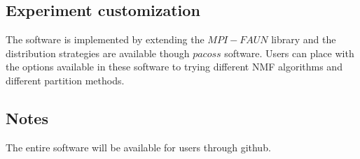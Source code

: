 \documentclass[sigconf, review=false]{acmart}
\begin{document}
\subsection{Experiment customization} 

The software is implemented by extending the $MPI-FAUN$ library and the distribution strategies are available though $pacoss$ software. Users can place with the options available in these software to trying different NMF algorithms and different partition methods. 

\subsection{Notes} 

The entire software will be available for users through github. 

\end{document}
